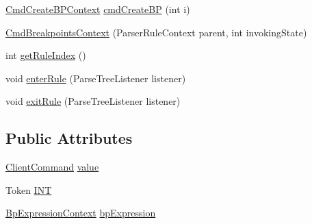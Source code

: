 \begin{DoxyCompactItemize}
\item 
\hyperlink{classgov_1_1nasa_1_1jpf_1_1inspector_1_1client_1_1parser_1_1_console_grammar_parser_1_1_cmd_create_b_p_context}{Cmd\+Create\+B\+P\+Context} \hyperlink{classgov_1_1nasa_1_1jpf_1_1inspector_1_1client_1_1parser_1_1_console_grammar_parser_1_1_cmd_breakpoints_context_aba4adde4b0e60ee5dfcaa96bd5a9bb97}{cmd\+Create\+BP} (int i)
\item 
\hyperlink{classgov_1_1nasa_1_1jpf_1_1inspector_1_1client_1_1parser_1_1_console_grammar_parser_1_1_cmd_breakpoints_context_a585193fb8a4c81706ce7cae6a09d1cab}{Cmd\+Breakpoints\+Context} (Parser\+Rule\+Context parent, int invoking\+State)
\item 
int \hyperlink{classgov_1_1nasa_1_1jpf_1_1inspector_1_1client_1_1parser_1_1_console_grammar_parser_1_1_cmd_breakpoints_context_a67deb73c4d658fcd4779f610fafd4dc0}{get\+Rule\+Index} ()
\item 
void \hyperlink{classgov_1_1nasa_1_1jpf_1_1inspector_1_1client_1_1parser_1_1_console_grammar_parser_1_1_cmd_breakpoints_context_ae392c69c70114b7a0eaabf45364b1c1a}{enter\+Rule} (Parse\+Tree\+Listener listener)
\item 
void \hyperlink{classgov_1_1nasa_1_1jpf_1_1inspector_1_1client_1_1parser_1_1_console_grammar_parser_1_1_cmd_breakpoints_context_ac56093ea02eb01a90b0e642b07e108b7}{exit\+Rule} (Parse\+Tree\+Listener listener)
\end{DoxyCompactItemize}
\subsection*{Public Attributes}
\begin{DoxyCompactItemize}
\item 
\hyperlink{classgov_1_1nasa_1_1jpf_1_1inspector_1_1client_1_1_client_command}{Client\+Command} \hyperlink{classgov_1_1nasa_1_1jpf_1_1inspector_1_1client_1_1parser_1_1_console_grammar_parser_1_1_cmd_breakpoints_context_a63c4310bd15c130c841d942db8cbf27a}{value}
\item 
Token \hyperlink{classgov_1_1nasa_1_1jpf_1_1inspector_1_1client_1_1parser_1_1_console_grammar_parser_1_1_cmd_breakpoints_context_a05249a2dccaabcb8dcdeac1d4279b87e}{I\+NT}
\item 
\hyperlink{classgov_1_1nasa_1_1jpf_1_1inspector_1_1client_1_1parser_1_1_console_grammar_parser_1_1_bp_expression_context}{Bp\+Expression\+Context} \hyperlink{classgov_1_1nasa_1_1jpf_1_1inspector_1_1client_1_1parser_1_1_console_grammar_parser_1_1_cmd_breakpoints_context_ad1c7b0e30ca67967e599b9d2e1342921}{bp\+Expression}
\end{DoxyCompactItemize}


